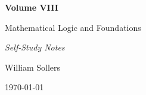 \begin{titlepage}
\centering

\vspace*{5cm}

{\Huge\bfseries Volume VIII\par}

\vspace{0.5cm}

{\LARGE Mathematical Logic and Foundations\par}

\vspace{0.5cm}

{\large\itshape Self-Study Notes\par}

\vfill

{\large William Sollers\par}

\vspace{0.5cm}

{\large \today\par}

\end{titlepage}

